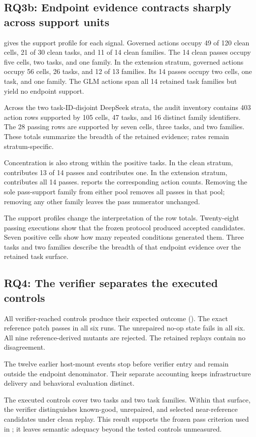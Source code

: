 \subsection{RQ3b: Endpoint evidence contracts sharply across support units}

 gives the support profile for each signal. Governed actions occupy 49 of 120 clean cells, 21 of 30 clean tasks, and 11 of 14 clean families. The 14 clean passes occupy five cells, two tasks, and one family. In the extension stratum, governed actions occupy 56 cells, 26 tasks, and 12 of 13 families. Its 14 passes occupy two cells, one task, and one family. The GLM actions span all 14 retained task families but yield no endpoint support.



Across the two task-ID-disjoint DeepSeek strata, the audit inventory contains 403 action rows supported by 105 cells, 47 tasks, and 16 distinct family identifiers. The 28 passing rows are supported by seven cells, three tasks, and two families. These totals summarize the breadth of the retained evidence; rates remain stratum-specific.

Concentration is also strong within the positive tasks. In the clean stratum,  contributes 13 of 14 passes and  contributes one. In the extension stratum,  contributes all 14 passes.  reports the corresponding action counts. Removing the sole pass-support family from either pool removes all passes in that pool; removing any other family leaves the pass numerator unchanged.

The support profiles change the interpretation of the row totals. Twenty-eight passing executions show that the frozen protocol produced accepted candidates. Seven positive cells show how many repeated conditions generated them. Three tasks and two families describe the breadth of that endpoint evidence over the retained task surface.

\subsection{RQ4: The verifier separates the executed controls}

All \VerifierReachedControls{} verifier-reached controls produce their expected outcome (). The exact reference patch passes in all six runs. The unrepaired no-op state fails in all six. All nine reference-derived mutants are rejected. The retained replays contain no disagreement.



The twelve earlier host-mount events stop before verifier entry and remain outside the endpoint denominator. Their separate accounting keeps infrastructure delivery and behavioral evaluation distinct.

The executed controls cover two tasks and two task families. Within that surface, the verifier distinguishes known-good, unrepaired, and selected near-reference candidates under clean replay. This result supports the frozen pass criterion used in ; it leaves semantic adequacy beyond the tested controls unmeasured.
